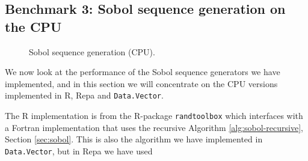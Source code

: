\subsection{Benchmark 3: Sobol sequence generation on the CPU}
\begin{figure}
	\centering
  \begin{adjustbox}{minipage=1.3\textwidth,margin=0pt \smallskipamount,center}
\end{adjustbox}
  \caption{Sobol sequence generation (CPU).}
\label{fig:sobol-cpu}
\end{figure}

We now look at the performance of the Sobol sequence generators we
have implemented, and in this section we will concentrate on the CPU
versions implemented in R, Repa and \texttt{Data.Vector}. 

The R implementation is from the R-package \texttt{randtoolbox} which
interfaces with a Fortran implementation that uses the recursive
Algorithm \ref{alg:sobol-recursive}, Section \ref{sec:sobol}. This is
also the algorithm we have implemented in \texttt{Data.Vector}, but in
Repa we have used 

